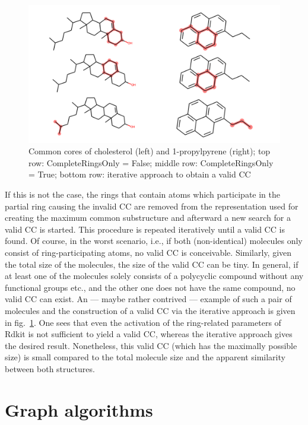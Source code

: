 \begin{figure}
	\includegraphics[scale=0.6]{cholesterol_pryenepropanoic_acid.png}
	
	\caption{Common cores of cholesterol (left) and 1-propylpyrene (right); top row: CompleteRingsOnly = False; middle row: CompleteRingsOnly = True; bottom row: iterative approach to obtain a valid {\trafo} CC}
	\label{fig:pyrene}
\end{figure}

If this is not the case, the rings that contain atoms which participate in the partial ring causing the invalid CC are removed from the representation used for creating the maximum common substructure and afterward a new search for a valid CC is started. This procedure is repeated iteratively until a valid CC is found.
Of course, in the worst scenario, i.e., if both (non-identical) molecules only consist of ring-participating atoms, no valid CC is conceivable. Similarly, given the total size of the molecules, the size of the valid CC can be tiny. In general, if at least one of the molecules solely consists of a polycyclic compound without any functional groups etc., and the other one does not have the same compound, no valid CC can exist. 
An --- maybe rather contrived --- example of such a pair of molecules and the construction of a valid CC via the iterative approach is given in fig.~\ref{fig:pyrene}. One sees that even the activation of the ring-related parameters of Rdkit is not sufficient to yield a valid CC, whereas the iterative approach gives the desired result. Nonetheless, this valid CC (which has the maximally possible size) is small compared to the total molecule size and the apparent similarity between both structures.



\section{Graph algorithms}


